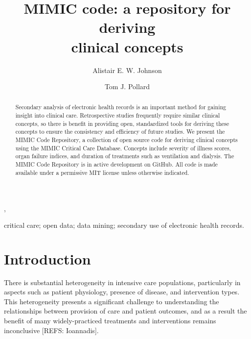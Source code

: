 \documentclass{elsart}
\begin{document}
\begin{frontmatter}
\title{MIMIC code: a repository for deriving\\ clinical concepts}

\author[Cambridge]{Alistair E. W. Johnson},
\author[Cambridge]{Tom J. Pollard}
\address[Cambridge]{Massachusetts institute of Technology, Cambridge}

          
\begin{keyword}
critical care; open data; data mining; secondary use of electronic health records.
\end{keyword}


\begin{abstract}
Secondary analysis of electronic health records is an important method for gaining insight into clinical care. Retrospective studies frequently require similar clinical concepts, so there is benefit in providing open, standardized tools for deriving these concepts to ensure the consistency and efficiency of future studies.
We present the MIMIC Code Repository, a collection of open source code for deriving clinical concepts using the MIMIC Critical Care Database. Concepts include severity of illness scores, organ failure indices, and duration of treatments such as ventilation and dialysis.
The MIMIC Code Repository is in active development on GitHub. All code is made available under a permissive MIT license unless otherwise indicated.\\
\end{abstract}

\end{frontmatter}


\section{Introduction}


There is substantial heterogeneity in intensive care populations, particularly in aspects such as patient physiology, presence of disease, and intervention types. This heterogeneity presents a significant challenge to understanding the relationships between provision of care and patient outcomes, and as a result the benefit of many widely-practiced treatments and interventions remains inconclusive [REFS: Ioannadis].
\end{document}
